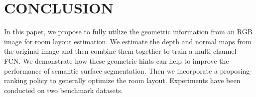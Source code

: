 \section{CONCLUSION}
\label{sec:Con}

In this paper, we propose to fully utilize the geometric information from an RGB image for room layout estimation. We estimate the depth and normal maps from the original image and then combine them together to train a multi-channel FCN. We demonstrate how these geometric hints can help to improve the performance of semantic surface segmentation. Then we incorporate a proposing-ranking policy to generally optimize the room layout. Experiments have been conducted on two benchmark datasets.